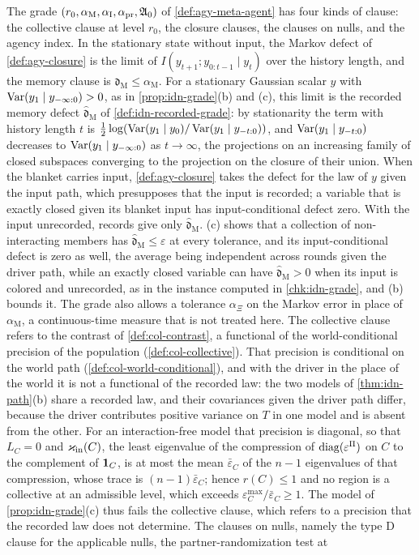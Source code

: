 \begin{remark}\label{rem:idn-grade}
The grade $(r_0,\alpha_{\mathrm M},\alpha_{\mathrm I},\alpha_{\mathrm{pr}},\mathfrak{A}_0)$ of \cref{def:agy-meta-agent} has four kinds of clause: the collective clause at level $r_0$, the closure clauses, the clauses on nulls, and the agency index. In the stationary state without input, the Markov defect of \cref{def:agy-closure} is the limit of $I(y_{t+1};y_{0:t-1}\mid y_t)$ over the history length, and the memory clause is $\mathfrak d_{\mathrm M}\le\alpha_{\mathrm M}$. For a stationary Gaussian scalar $y$ with $\operatorname{Var}(y_1\mid y_{-\infty:0})>0$, as in \cref{prop:idn-grade}(b) and (c), this limit is the recorded memory defect $\hat{\mathfrak d}_{\mathrm M}$ of \cref{def:idn-recorded-grade}: by stationarity the term with history length $t$ is $\tfrac12\log(\operatorname{Var}(y_1\mid y_0)/\operatorname{Var}(y_1\mid y_{-t:0}))$, and $\operatorname{Var}(y_1\mid y_{-t:0})$ decreases to $\operatorname{Var}(y_1\mid y_{-\infty:0})$ as $t\to\infty$, the projections on an increasing family of closed subspaces converging to the projection on the closure of their union. When the blanket carries input, \cref{def:agy-closure} takes the defect for the law of $y$ given the input path, which presupposes that the input is recorded; a variable that is exactly closed given its blanket input has input-conditional defect zero. With the input unrecorded, records give only $\hat{\mathfrak d}_{\mathrm M}$. (c) shows that a collection of non-interacting members has $\hat{\mathfrak d}_{\mathrm M}\le\varepsilon$ at every tolerance, and its input-conditional defect is zero as well, the average being independent across rounds given the driver path, while an exactly closed variable can have $\hat{\mathfrak d}_{\mathrm M}>0$ when its input is colored and unrecorded, as in the instance computed in \cref{chk:idn-grade}, and (b) bounds it. The grade also allows a tolerance $\alpha_\Xi$ on the Markov error in place of $\alpha_{\mathrm M}$, a continuous-time measure that is not treated here. The collective clause refers to the contrast of \cref{def:col-contrast}, a functional of the world-conditional precision of the population (\cref{def:col-collective}). That precision is conditional on the world path (\cref{def:col-world-conditional}), and with the driver in the place of the world it is not a functional of the recorded law: the two models of \cref{thm:idn-path}(b) share a recorded law, and their covariances given the driver path differ, because the driver contributes positive variance on $T$ in one model and is absent from the other. For an interaction-free model that precision is diagonal, so that $L_C=0$ and $\varkappa_{\mathrm{in}}(C)$, the least eigenvalue of the compression of $\operatorname{diag}(\varepsilon^\Pi)$ on $C$ to the complement of $\mathbf{1}_C$, is at most the mean $\bar\varepsilon_C$ of the $n-1$ eigenvalues of that compression, whose trace is $(n-1)\bar\varepsilon_C$; hence $r(C)\le1$ and no region is a collective at an admissible level, which exceeds $\varepsilon^{\max}_C/\bar\varepsilon_C\ge1$. The model of \cref{prop:idn-grade}(c) thus fails the collective clause, which refers to a precision that the recorded law does not determine. The clauses on nulls, namely the type D clause for the applicable nulls, the partner-randomization test at 
\end{remark}
